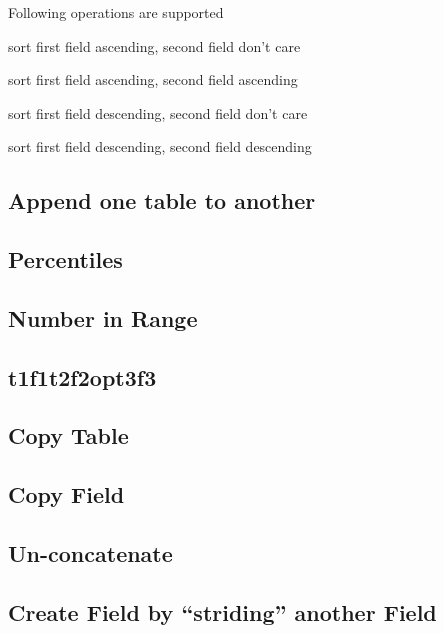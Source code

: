 Following operations are supported
\be
\item sort first field ascending, second field don't care 
\item sort first field ascending, second field ascending
\item sort first field descending, second field don't care 
\item sort first field descending, second field descending
\ee

\subsection{Append one table to another}
\label{app_tbl}
\TBC
\subsection{Percentiles}
\label{percentiles}
\TBC
\subsection{Number in Range}
\label{num_in_range}
\TBC
\subsection{t1f1t2f2opt3f3} 
\label{t1f1t2f2opt3f3} 
\TBC
\subsection{Copy Table}
\label{copy_tbl} 
\TBC
\subsection{Copy Field}
\label{copy_fld} 
\TBC
\subsection{Un-concatenate}
\label{f1opf2f3} 
\TBC
\subsection{Create Field by ``striding'' another Field}
\label{stride} 


